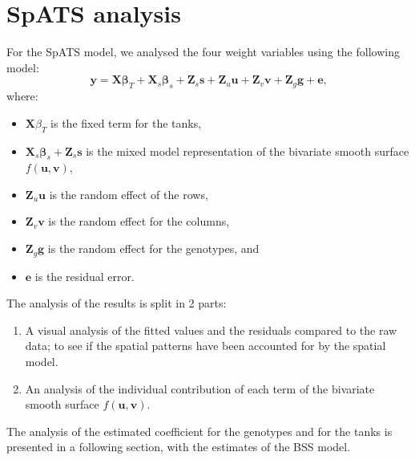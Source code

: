 \section{SpATS analysis}
For the SpATS model, we analysed the four weight variables using the following model:
\begin{equation}
	\mathbf{y} =\mathbf{X} \boldsymbol{\beta}_{T} +\mathbf{X}_{s} \boldsymbol{\beta}_{s}+\mathbf{Z}_{s} \mathbf{s}+\mathbf{Z}_{u} \mathbf{u}
	+ \mathbf{Z}_{v} \mathbf{v} + \mathbf{Z}_{g} \mathbf{g}+ \mathbf{e} \text{,}
\end{equation}
where:
\begin{itemize}
	\item $\mathbf{X} \beta_{T}$ is the fixed term for the tanks,
	\item $\mathbf{X}_{s} \boldsymbol{\beta}_{s}+\mathbf{Z}_{s} \mathbf{s}$ is the mixed model representation of the bivariate smooth surface $f(\mathbf{u},\mathbf{v})$,
	\item $\mathbf{Z}_{u} \mathbf{u}$ is the random effect of the rows,
	\item $\mathbf{Z}_{v} \mathbf{v}$ is the random effect for the columns,
	\item $\mathbf{Z}_{g} \mathbf{g}$ is the random effect for the genotypes, and 
	\item $\mathbf{e}$ is the residual error.
\end{itemize}

The analysis of the results is split in 2 parts:
\begin{enumerate}
	\item A visual analysis of the fitted values and the residuals compared to the raw data; to see if the 
	spatial patterns have been accounted for by the spatial model.
	\item An analysis of the individual contribution of each term of the bivariate smooth surface $f(\mathbf{u},\mathbf{v})$.
\end{enumerate}
The analysis of the estimated coefficient for the genotypes and for the tanks is presented in a following section, with the estimates of the BSS model.

